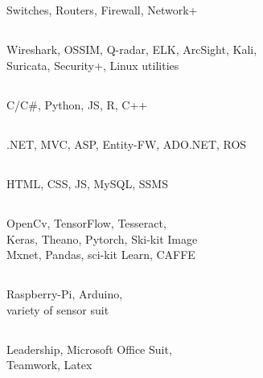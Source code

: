 \documentclass[9pt]{ShumailaAhmed-Resume}
\begin{document}
\begin{minipage}[t]{0.33\textwidth}
\subsection*{ }
{\footnotesize Switches, Routers, Firewall, Network+}
\vspace{2pt}
\subsection*{ }
{\footnotesize Wireshark, OSSIM, Q-radar, ELK, ArcSight, Kali, \\
Suricata, Security+, Linux utilities}
\vspace{2pt}
\subsection*{ }
{\footnotesize C/C\#, Python, JS, R, C++}
\vspace{2pt}
\subsection*{}
{\footnotesize .NET, MVC, ASP, Entity-FW, ADO.NET, ROS}
\vspace{2pt}
\subsection*{}
{\footnotesize HTML, CSS, JS, MySQL, SSMS}

\vspace{2pt}
\subsection*{}
{\footnotesize OpenCv, TensorFlow, Tesseract,}\\
{\footnotesize Keras, Theano, Pytorch, Ski-kit Image}\\
{\footnotesize Mxnet, Pandas, sci-kit Learn, CAFFE}
 
\vspace{2pt}
\subsection*{}
{\footnotesize Raspberry-Pi, Arduino,} \\
{\footnotesize variety of sensor suit}
\vspace{2pt}
\subsection*{}
{\footnotesize Leadership, Microsoft Office Suit,}\\
{\footnotesize Teamwork, Latex}


\end{minipage}
\end{document}
